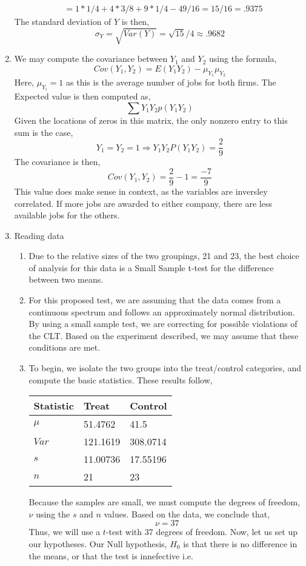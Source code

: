 \documentclass[letterpaper,10pt]{article}
\begin{document}
\begin{enumerate}
\begin{align*}
&=1*1/4+4*3/8+9*1/4-49/16=15/16=.9375
\end{align*}
The standard deviation of $Y$ is then,
\[\sigma_Y=\sqrt{Var(Y)}=\sqrt{15}/4\approx .9682\]
\item We may compute the covariance between $Y_1$ and $Y_2$ using the formula,
\[Cov(Y_1,Y_2)=E(Y_1Y_2)-\mu_{Y_1}\mu_{Y_2}\]
Here, $\mu_{Y_i}=1$ as this is the average number of jobs for both firms. The Expected value is then computed as,
\[\sum Y_1Y_2p(Y_1Y_2)\]
Given the locations of zeros in this matrix, the only nonzero entry to this sum is the case,
\[Y_1=Y_2=1\Rightarrow Y_1Y_2P(Y_1Y_2)=\frac{2}{9}\]
The covariance is then,
\[Cov(Y_1,Y_2)=\frac{2}{9}-1=\frac{-7}{9}\]
This value does make sense in context, as the variables are inversley correlated. If more jobs are awarded to either company, there are less available jobs for the others.
\item Reading data
\begin{enumerate}
\item Due to the relative sizes of the two groupings, 21 and 23, the best choice of analysis for this data is a Small Sample t-test for the difference between two means. 
\item For this proposed test, we are assuming that the data comes from a continuous spectrum and follows an approximately normal distribution. By using a small sample test, we are correcting for possible violations of the CLT. Based on the experiment described, we may assume that these conditions are met. 
\item To begin, we isolate the two groups into the treat/control categories, and compute the basic statistics. These results follow,
\begin{center}
\begin{tabular}{l|ll}
Statistic & Treat & Control \\\hline
$\mu$ & 51.4762 & 41.5\\
$Var$ & 121.1619 & 308.0714\\
$s$ & 11.00736 & 17.55196\\
$n$ & 21 & 23\\\hline
\end{tabular}
\end{center}
Because the samples are small, we must compute the degrees of freedom, $\nu$ using the $s$ and $n$ values. Based on the data, we conclude that,
\[\nu=37\]
Thus, we will use a $t$-test with 37 degrees of freedom.  Now, let us set up our hypotheses. Our Null hypothesis, $H_0$ is that there is no difference in the means, or that the test is innefective i.e.

\end{enumerate}
\end{enumerate}
\end{document}
